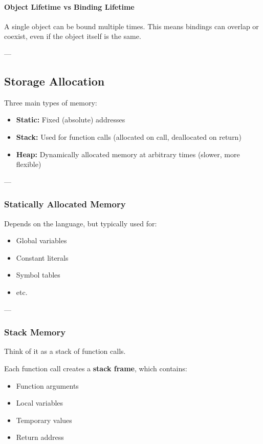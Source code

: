 \documentclass{article}
\begin{document}
\paragraph{Object Lifetime vs Binding Lifetime}
A single object can be bound multiple times.  
This means bindings can overlap or coexist, even if the object itself is the same.

---

\subsection{Storage Allocation}

Three main types of memory:

\begin{itemize}
  \item \textbf{Static:} Fixed (absolute) addresses
  \item \textbf{Stack:} Used for function calls (allocated on call, deallocated on return)
  \item \textbf{Heap:} Dynamically allocated memory at arbitrary times (slower, more flexible)
\end{itemize}

---

\subsubsection{Statically Allocated Memory}
Depends on the language, but typically used for:
\begin{itemize}
  \item Global variables
  \item Constant literals
  \item Symbol tables
  \item etc.
\end{itemize}

---

\subsubsection{Stack Memory}
Think of it as a stack of function calls.

Each function call creates a \textbf{stack frame}, which contains:
\begin{itemize}
  \item Function arguments
  \item Local variables
  \item Temporary values
  \item Return address
\end{itemize}
\end{document}
